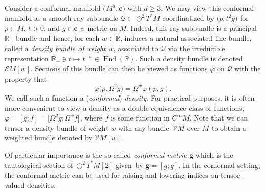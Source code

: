 \documentclass[pdftex]{sigma}
\numberwithin{equation}{section}
\newcommand{\ce}{\mathcal{E}}
\newcommand{\cc}{\boldsymbol{c}}
\newcommand{\bg}{\boldsymbol{g}}
\renewcommand{\=}{\stackrel \Lambda =}
\begin{document}
Consider a conformal manifold $\bigl(M^d,\cc\bigr)$ with $d \geq 3$. We may view this conformal manifold as a smooth ray subbundle $\mathcal{Q} \subset \odot^2 T^* M$ coordinatized by $\bigl(p,t^2 g\bigr)$ for $p \in M$, $t > 0$, and $g \in \cc$ a~metric on $M$. Indeed, this ray subbundle is a principal $\mathbb{R}_+$ bundle and hence, for each $w \in \mathbb{R}$, induces a natural associated line bundle, called a \textit{density bundle of weight $w$}, associated to $\mathcal{Q}$ via the irreducible representation $\mathbb{R}_+ \ni t \mapsto t^{-w} \in \operatorname{End}(\mathbb{R})$. Such a density bundle is denoted~$\ce M[w]$. Sections of this bundle can then be viewed as functions $\varphi$ on $\mathcal{Q}$ with the property that
\[\varphi\bigl(p, \Omega^2 g\bigr) = \Omega^w \varphi(p,g) .\]
We call such a function a (\textit{conformal}) \textit{density}. For practical purposes, it is often more convenient to view a density as a double equivalence class of functions, $\varphi = [g;f] = \bigl[\Omega^2 g; \Omega^w f\bigr]$, where $f$ is some function in $C^\infty M$. Note that we can tensor a density bundle of weight $w$ with any bundle~$\mathcal{V} M$ over $M$ to obtain a weighted bundle denoted by $\mathcal{V} M[w]$.

Of particular importance is the so-called \textit{conformal metric} $\bg$ which is the tautological section of $\odot^2 T^* M[2]$ given~by $\bg = [g;g]$. In the conformal setting, the conformal metric can be used for raising and lowering indices on tensor-valued densities.
\end{document}
